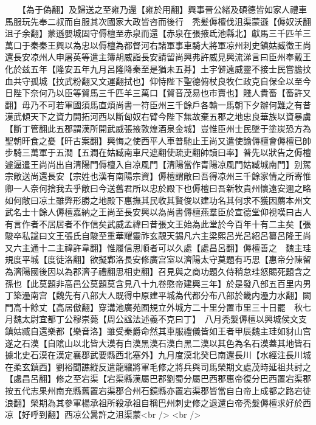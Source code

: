 　　【為于偽翻】及歸送之至雍乃還【雍於用翻】興事晉公緒及碩德皆如家人禮車馬服玩先奉二叔而自服其次國家大政皆咨而後行　秃髪傉檀伐沮渠蒙遜【傉奴沃翻沮子余翻】蒙遜嬰城固守傉檀至赤泉而還【赤泉在張掖氐池縣北】獻馬三千匹羊三萬口于秦秦王興以為忠以傉檀為都督河右諸軍事車騎大將軍凉州刺史鎮姑臧徵王尚還長安凉州人申屠英等遣主簿胡威詣長安請留尚興弗許威見興流涕言曰臣州奉戴王化於兹五年【隆安五年九月呂隆降秦至是猶未五朞】土宇僻遠威靈不接士民嘗膽抆血共守孤城【抆武粉翻又文運翻拭也】仰恃陛下聖德俯杖良牧仁政克自保全以至今日陛下奈何乃以臣等貿馬三千匹羊三萬口【貿音茂易也市賣也】賤人貴畜【畜許又翻】毋乃不可若軍國須馬直煩尚書一符臣州三千餘戶各輸一馬朝下夕辦何難之有昔漢武傾天下之資力開拓河西以斷匈奴右臂今陛下無故棄五郡之地忠良華族以資暴虜【斷丁管翻此五郡謂漢所開武威張掖敦煌酒泉金城】豈惟臣州士民墜于塗炭恐方為聖朝旰食之憂【旰古案翻】興悔之使西平人車普馳止王尚又遣使諭傉檀會傉檀已帥步騎三萬軍于五澗【五澗在姑臧南車尺遮翻使疏吏翻帥讀曰率】普先以狀告之傉檀遽逼遣王尚尚出自清陽門傉檀入自凉風門【清陽當作青陽凉風門姑臧城南門】别駕宗敞送尚還長安【宗姓也漢有南陽宗資】傉檀謂敞曰吾得凉州三千餘家情之所寄惟卿一人奈何捨我去乎敞曰今送舊君所以忠於殿下也傉檀曰吾新牧貴州懷遠安邇之略如何敞曰凉土雖弊形勝之地殿下惠撫其民收其賢俊以建功名其何求不獲因薦本州文武名士十餘人傉檀嘉納之王尚至長安興以為尚書傉檀燕羣臣於宣德堂仰視嘆曰古人有言作者不居居者不作信矣武威孟禕曰昔張文王始為此堂於今百年十有二主矣【張駿卒私諡曰文王張氏自駿至重華耀靈祚玄靚天錫凡六主梁熙呂光呂紹呂纂呂隆王尚又六主通十二主禕許韋翻】惟履信思順者可以久處【處昌呂翻】傉檀善之　魏主珪規度平城【度徒洛翻】欲擬鄴洛長安修廣宫室以濟陽太守莫題有巧思【惠帝分陳留為濟陽國後因以為郡濟子禮翻思相吏翻】召見與之商功題久侍稍怠珪怒賜死題含之孫也【此莫題非高邑公莫題莫含見八十九卷愍帝建興三年】於是發八部五百里内男丁築灅南宫【魏先有八部大人既得中原建平城為代都分布八部於畿内灅力水翻】闕門高十餘丈【高居傲翻】穿溝池廣苑囿規立外城方二十里分置市里三十日罷　秋七月魏太尉宜都丁公穆崇薨【周公諡法述義不克曰丁】　八月秃髮傉檀以興城侯文支鎮姑臧自還樂都【樂音洛】雖受秦爵命然其車服禮儀皆如王者甲辰魏主珪如豺山宫遂之石漠【自隂山以北皆大漠有白漠黑漠石漠白黑二漠以其色為名石漠蓋其地皆石據北史石漠在漢定襄郡武要縣西北塞外】九月度漠北癸巳南還長川【水經注長川城在柔玄鎮西】劉裕聞譙縱反遣龍驤將軍毛修之將兵與司馬榮期文處茂時延祖共討之【處昌呂翻】修之至宕渠【宕渠縣漢屬巴郡劉蜀分屬巴西郡惠帝復分巴西置宕渠郡按五代志果州南充縣舊置宕渠郡合州石鏡縣亦置宕渠郡皆當自白帝上成都之路宕徒浪翻】榮期為其參軍楊承祖所殺承祖自稱巴州刺史修之退還白帝秃髮傉檀求好於西凉【好呼到翻】西凉公暠許之沮渠蒙<br />
<br />
